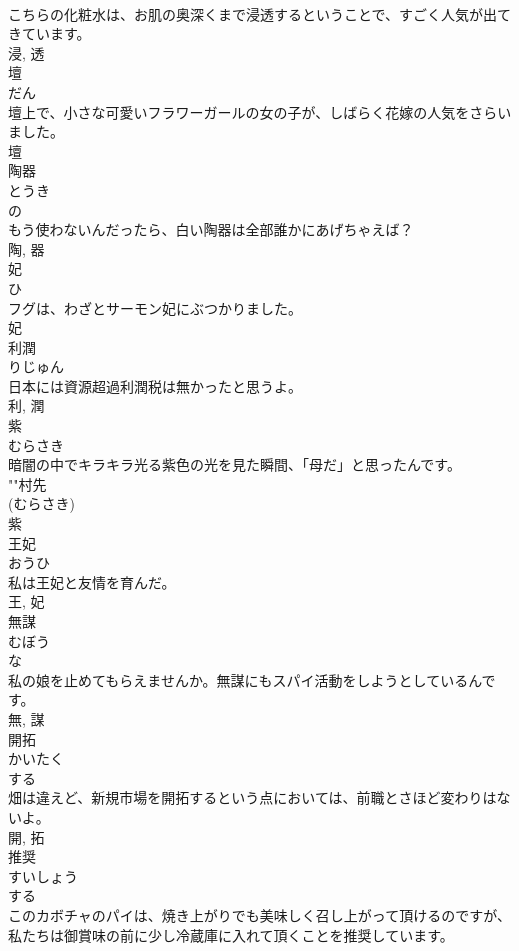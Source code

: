 \documentclass[8pt]{extreport}
\begin{document}
\begin{CJK}{UTF8}{min}
\\	こちらの化粧水は、お肌の奥深くまで浸透するということで、すごく人気が出てきています。	
\\	浸, 透	
\\	壇	
\\	だん	
\\	壇上で、小さな可愛いフラワーガールの女の子が、しばらく花嫁の人気をさらいました。	
\\	壇	
\\	陶器	
\\	とうき	
\\	の 
\\	もう使わないんだったら、白い陶器は全部誰かにあげちゃえば？	
\\	陶, 器	
\\	妃	
\\	ひ	
\\	フグは、わざとサーモン妃にぶつかりました。	
\\	妃	
\\	利潤	
\\	りじゅん	
\\	日本には資源超過利潤税は無かったと思うよ。	
\\	利, 潤	
\\	紫	
\\	むらさき	
\\	暗闇の中でキラキラ光る紫色の光を見た瞬間、「母だ」と思ったんです。	
\\	""村先
\\	(むらさき) 
\\	紫	
\\	王妃	
\\	おうひ	
\\	私は王妃と友情を育んだ。	
\\	王, 妃	
\\	無謀	
\\	むぼう	
\\	な 
\\	私の娘を止めてもらえませんか。無謀にもスパイ活動をしようとしているんです。	
\\	無, 謀	
\\	開拓	
\\	かいたく	
\\	する 
\\	畑は違えど、新規市場を開拓するという点においては、前職とさほど変わりはないよ。	
\\	開, 拓	
\\	推奨	
\\	すいしょう	
\\	する 
\\	このカボチャのパイは、焼き上がりでも美味しく召し上がって頂けるのですが、私たちは御賞味の前に少し冷蔵庫に入れて頂くことを推奨しています。	

\end{CJK}
\end{document}
